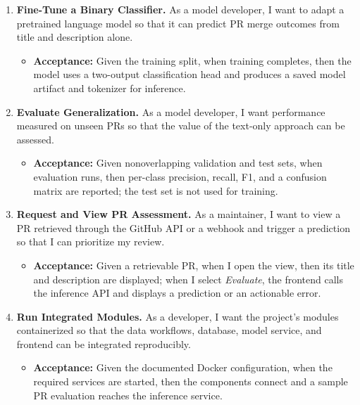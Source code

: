 \documentclass[conference,a4paper,flushend]{cs-techrep}
\begin{document}
\begin{enumerate}[label={US\arabic*},series=stories]
\item \textbf{Fine-Tune a Binary Classifier.} As a model developer, I want to adapt a pretrained language model so that it can predict PR merge outcomes from title and description alone.
  \begin{itemize}
    \item \textbf{Acceptance:} Given the training split, when training completes, then the model uses a two-output classification head and produces a saved model artifact and tokenizer for inference.
  \end{itemize}

\item \textbf{Evaluate Generalization.} As a model developer, I want performance measured on unseen PRs so that the value of the text-only approach can be assessed.
  \begin{itemize}
    \item \textbf{Acceptance:} Given nonoverlapping validation and test sets, when evaluation runs, then per-class precision, recall, F1, and a confusion matrix are reported; the test set is not used for training.
  \end{itemize}

\item \textbf{Request and View PR Assessment.} As a maintainer, I want to view a PR retrieved through the GitHub API or a webhook and trigger a prediction so that I can prioritize my review.
  \begin{itemize}
    \item \textbf{Acceptance:} Given a retrievable PR, when I open the view, then its title and description are displayed; when I select \emph{Evaluate}, the frontend calls the inference API and displays a prediction or an actionable error.
  \end{itemize}

\item \textbf{Run Integrated Modules.} As a developer, I want the project's modules containerized so that the data workflows, database, model service, and frontend can be integrated reproducibly.
  \begin{itemize}
    \item \textbf{Acceptance:} Given the documented Docker configuration, when the required services are started, then the components connect and a sample PR evaluation reaches the inference service.
  \end{itemize}
\end{enumerate}
\end{document}
